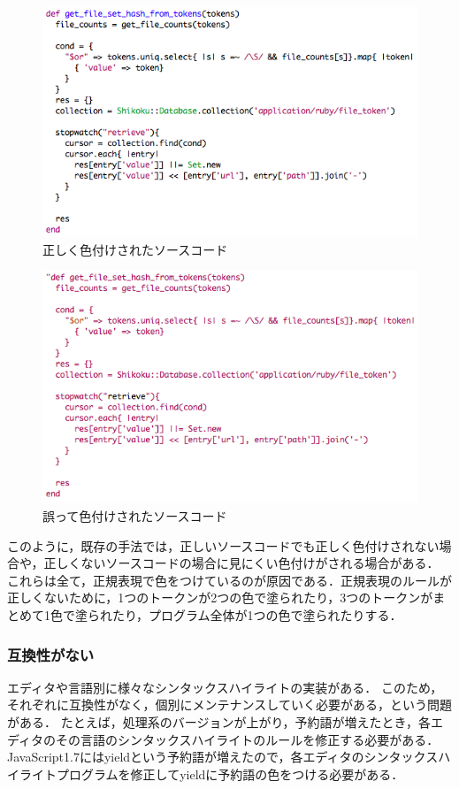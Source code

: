\documentclass{cs-thesis}
\begin{document}
  \begin{figure}[b]
   \centering
   \includegraphics[scale=0.7]{emacs-right-delimiter.png}
   \caption{正しく色付けされたソースコード}
   \label{emacs-right-delimiter}
  \end{figure}

  \begin{figure}[t]
   \centering
   \includegraphics[scale=0.7]{emacs-wrong-delimiter.png}
   \caption{誤って色付けされたソースコード}
   \label{emacs-wrong-delimiter}
  \end{figure}

  このように，既存の手法では，正しいソースコードでも正しく色付けされない場合や，正しくないソースコードの場合に見にくい色付けがされる場合がある．
  これらは全て，正規表現で色をつけているのが原因である．正規表現のルールが正しくないために，1つのトークンが2つの色で塗られたり，3つのトークンがまとめて1色で塗られたり，プログラム全体が1つの色で塗られたりする．

  \subsubsection{互換性がない}
  エディタや言語別に様々なシンタックスハイライトの実装がある．
  このため，それぞれに互換性がなく，個別にメンテナンスしていく必要がある，という問題がある．
  たとえば，処理系のバージョンが上がり，予約語が増えたとき，各エディタのその言語のシンタックスハイライトのルールを修正する必要がある．
  JavaScript1.7にはyieldという予約語が増えたので，各エディタのシンタックスハイライトプログラムを修正してyieldに予約語の色をつける必要がある．
\end{document}
